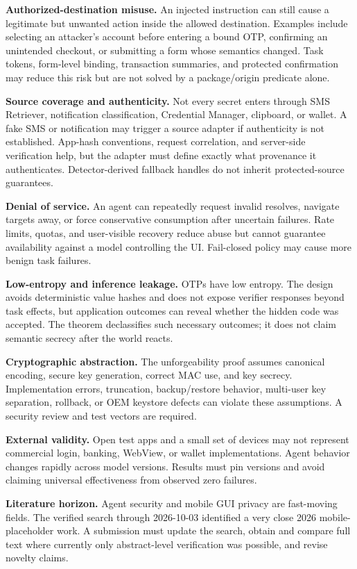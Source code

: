 \textbf{Authorized-destination misuse.} An injected instruction can still cause a legitimate but unwanted action inside the allowed destination. Examples include selecting an attacker's account before entering a bound OTP, confirming an unintended checkout, or submitting a form whose semantics changed. Task tokens, form-level binding, transaction summaries, and protected confirmation may reduce this risk but are not solved by a package/origin predicate alone.

\textbf{Source coverage and authenticity.} Not every secret enters through SMS Retriever, notification classification, Credential Manager, clipboard, or wallet. A fake SMS or notification may trigger a source adapter if authenticity is not established. App-hash conventions, request correlation, and server-side verification help, but the adapter must define exactly what provenance it authenticates. Detector-derived fallback handles do not inherit protected-source guarantees.

\textbf{Denial of service.} An agent can repeatedly request invalid resolves, navigate targets away, or force conservative consumption after uncertain failures. Rate limits, quotas, and user-visible recovery reduce abuse but cannot guarantee availability against a model controlling the UI. Fail-closed policy may cause more benign task failures.

\textbf{Low-entropy and inference leakage.} OTPs have low entropy. The design avoids deterministic value hashes and does not expose verifier responses beyond task effects, but application outcomes can reveal whether the hidden code was accepted. The theorem declassifies such necessary outcomes; it does not claim semantic secrecy after the world reacts.

\textbf{Cryptographic abstraction.} The unforgeability proof assumes canonical encoding, secure key generation, correct MAC use, and key secrecy. Implementation errors, truncation, backup/restore behavior, multi-user key separation, rollback, or OEM keystore defects can violate these assumptions. A security review and test vectors are required.

\textbf{External validity.} Open test apps and a small set of devices may not represent commercial login, banking, WebView, or wallet implementations. Agent behavior changes rapidly across model versions. Results must pin versions and avoid claiming universal effectiveness from observed zero failures.

\textbf{Literature horizon.} Agent security and mobile GUI privacy are fast-moving fields. The verified search through 2026-10-03 identified a very close 2026 mobile-placeholder work. A submission must update the search, obtain and compare full text where currently only abstract-level verification was possible, and revise novelty claims.
